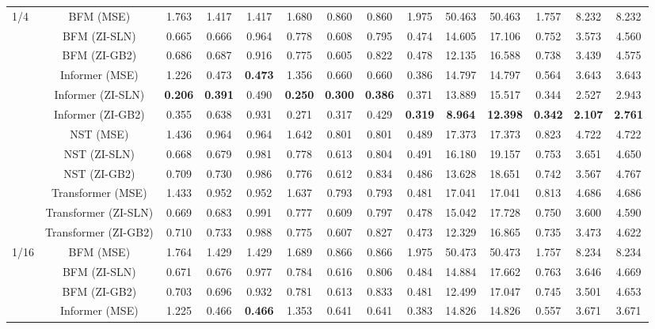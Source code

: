 \begin{table}[htbp]
{\begin{tabular}{lccccccccccccc}
\midrule
\multirow{9}{*}{1/4} & BFM (MSE) & 1.763 & 1.417 & 1.417 & 1.680 & 0.860 & 0.860 & 1.975 & 50.463 & 50.463 & 1.757 & 8.232 & 8.232 \\
 & BFM (ZI-SLN) & 0.665 & 0.666 & 0.964 & 0.778 & 0.608 & 0.795 & 0.474 & 14.605 & 17.106 & 0.752 & 3.573 & 4.560 \\
 & BFM (ZI-GB2) & 0.686 & 0.687 & 0.916 & 0.775 & 0.605 & 0.822 & 0.478 & 12.135 & 16.588 & 0.738 & 3.439 & 4.575 \\
 & Informer (MSE) & 1.226 & 0.473 & \textbf{0.473} & 1.356 & 0.660 & 0.660 & 0.386 & 14.797 & 14.797 & 0.564 & 3.643 & 3.643 \\
 & Informer (ZI-SLN) & \textbf{0.206} & \textbf{0.391} & 0.490 & \textbf{0.250} & \textbf{0.300} & \textbf{0.386} & 0.371 & 13.889 & 15.517 & 0.344 & 2.527 & 2.943 \\
 & Informer (ZI-GB2) & 0.355 & 0.638 & 0.931 & 0.271 & 0.317 & 0.429 & \textbf{0.319} & \textbf{8.964} & \textbf{12.398} & \textbf{0.342} & \textbf{2.107} & \textbf{2.761} \\
 & NST (MSE) & 1.436 & 0.964 & 0.964 & 1.642 & 0.801 & 0.801 & 0.489 & 17.373 & 17.373 & 0.823 & 4.722 & 4.722 \\
 & NST (ZI-SLN) & 0.668 & 0.679 & 0.981 & 0.778 & 0.613 & 0.804 & 0.491 & 16.180 & 19.157 & 0.753 & 3.651 & 4.650 \\
 & NST (ZI-GB2) & 0.709 & 0.730 & 0.986 & 0.776 & 0.612 & 0.834 & 0.486 & 13.628 & 18.651 & 0.742 & 3.567 & 4.767 \\
 & Transformer (MSE) & 1.433 & 0.952 & 0.952 & 1.637 & 0.793 & 0.793 & 0.481 & 17.041 & 17.041 & 0.813 & 4.686 & 4.686 \\
 & Transformer (ZI-SLN) & 0.669 & 0.683 & 0.991 & 0.777 & 0.609 & 0.797 & 0.478 & 15.042 & 17.728 & 0.750 & 3.600 & 4.590 \\
 & Transformer (ZI-GB2) & 0.710 & 0.733 & 0.988 & 0.775 & 0.607 & 0.827 & 0.473 & 12.329 & 16.865 & 0.735 & 3.473 & 4.622 \\
\midrule
\multirow{9}{*}{1/16} & BFM (MSE) & 1.764 & 1.429 & 1.429 & 1.689 & 0.866 & 0.866 & 1.975 & 50.473 & 50.473 & 1.757 & 8.234 & 8.234 \\
 & BFM (ZI-SLN) & 0.671 & 0.676 & 0.977 & 0.784 & 0.616 & 0.806 & 0.484 & 14.884 & 17.662 & 0.763 & 3.646 & 4.669 \\
 & BFM (ZI-GB2) & 0.703 & 0.696 & 0.932 & 0.781 & 0.613 & 0.833 & 0.481 & 12.499 & 17.047 & 0.745 & 3.501 & 4.653 \\
 & Informer (MSE) & 1.225 & 0.466 & \textbf{0.466} & 1.353 & 0.641 & 0.641 & 0.383 & 14.826 & 14.826 & 0.557 & 3.671 & 3.671 \\

\end{tabular}}
\end{table}
